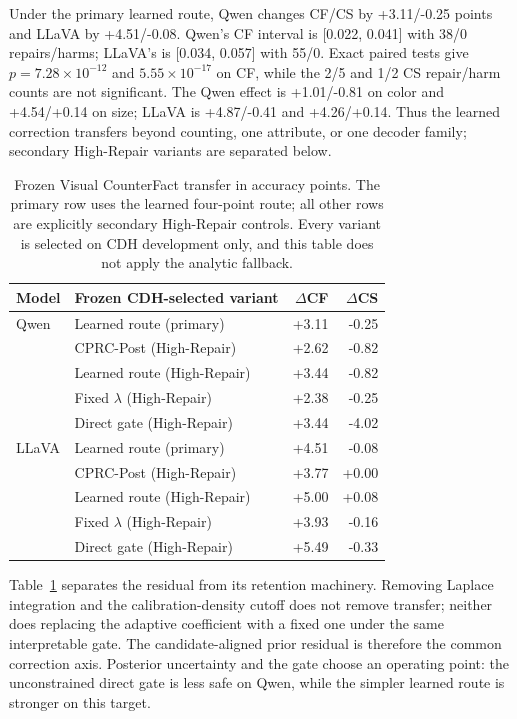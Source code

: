 \documentclass[letterpaper]{article}
\begin{document}
Under the primary learned route, Qwen changes CF/CS by +3.11/-0.25 points and LLaVA by
+4.51/-0.08. Qwen's CF interval is [0.022, 0.041] with 38/0 repairs/harms;
LLaVA's is [0.034, 0.057] with 55/0. Exact paired tests give
$p=7.28\!\times\!10^{-12}$ and $5.55\!\times\!10^{-17}$ on CF, while the
2/5 and 1/2 CS repair/harm counts are not significant. The Qwen effect is
+1.01/-0.81 on color and +4.54/+0.14 on size; LLaVA is +4.87/-0.41 and
+4.26/+0.14. Thus the learned correction transfers beyond counting, one
attribute, or one decoder family; secondary High-Repair variants are separated
below.

\begin{table}[t]
\centering
\small
\setlength{\tabcolsep}{2.0pt}
\begin{tabular}{llrr}
\toprule
Model & Frozen CDH-selected variant & $\Delta$CF & $\Delta$CS \\
\midrule
Qwen & Learned route (primary) & +3.11 & -0.25 \\
 & CPRC-Post (High-Repair) & +2.62 & -0.82 \\
 & Learned route (High-Repair) & +3.44 & -0.82 \\
 & Fixed $\lambda$ (High-Repair) & +2.38 & -0.25 \\
 & Direct gate (High-Repair) & +3.44 & -4.02 \\
LLaVA & Learned route (primary) & +4.51 & -0.08 \\
 & CPRC-Post (High-Repair) & +3.77 & +0.00 \\
 & Learned route (High-Repair) & +5.00 & +0.08 \\
 & Fixed $\lambda$ (High-Repair) & +3.93 & -0.16 \\
 & Direct gate (High-Repair) & +5.49 & -0.33 \\
\bottomrule
\end{tabular}
\caption{Frozen Visual CounterFact transfer in accuracy points. The primary
row uses the learned four-point route; all other rows are explicitly
secondary High-Repair controls. Every variant is selected on CDH development
only, and this table does not apply the analytic fallback.}
\label{tab:vcf-controls}
\end{table}

Table~\ref{tab:vcf-controls} separates the residual from its retention
machinery. Removing Laplace integration and the calibration-density cutoff does
not remove transfer; neither does replacing the adaptive coefficient with a
fixed one under the same interpretable gate. The candidate-aligned prior
residual is therefore the common correction axis. Posterior uncertainty and
the gate choose an operating point: the unconstrained direct gate is less safe
on Qwen, while the simpler learned route is stronger on this target.
\end{document}
